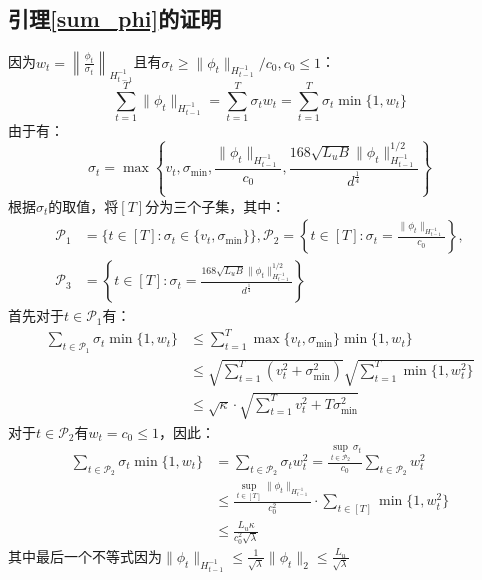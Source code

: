\documentclass[UTF8,a4paper,10.5pt]{ctexart}
\newcommand{\Pcal}{\mathcal P}
\begin{document}
\subsection{引理\ref{sum_phi}的证明}
因为$w_t = \left\|\frac{\phi_t}{\sigma_t}\right\|_{H_{t-1}^{-1}}$且有$\sigma_t\geq \|\phi_t\|_{H_{t-1}^{-1}}/c_0,c_0\leq 1$：
\begin{equation*}
	\sum_{t=1}^{T} \|\phi_t\|_{H_{t-1}^{-1}} = \sum_{t=1}^{T}\sigma_tw_t = \sum_{t=1}^{T}\sigma_t\min\{1,w_t\}
\end{equation*}
由于有：
\begin{equation*}
	\sigma_t= \max\left\{v_t, \sigma_{\min}, \frac{\|\phi_t\|_{H_{t-1}^{-1}}}{c_0}, \frac{168\sqrt{L_uB}\|\phi_t\|^{1/2}_{H_{t-1}^{-1}}}{d^{\frac{1}{4}}}\right\}
\end{equation*}
根据$\sigma_t$的取值，将$[T]$分为三个子集，其中：
\begin{align*}
	\Pcal_1 &= \{t\in [T]: \sigma_t \in \{v_t,\sigma_{\min}\}\}, \Pcal_2 = \left\{t\in [T]:\sigma_t = \frac{\|\phi_t\|_{H_{t-1}^{-1}}}{c_0}\right\}, \\ 
	\Pcal_3 &= \left\{t\in [T]: \sigma_t = \frac{168\sqrt{L_uB}\|\phi_t\|^{1/2}_{H_{t-1}^{-1}}}{d^{\frac{1}{4}}}\right\}
\end{align*}
首先对于$t\in \Pcal_1$有：
\begin{align}
	\sum_{t\in \Pcal_1}\sigma_t\min\{1,w_t\} & \leq \sum_{t=1}^T \max\{v_t, \sigma_{\min}\}\min\{1, w_t\}\nonumber \\
	& \leq \sqrt{\sum_{t=1}^{T}(v_t^2+\sigma_{\min}^2)}\sqrt{\sum_{t=1}^{T}\min\{1,w_t^2\}} \nonumber \\
	& \leq \sqrt{\kappa}\cdot \sqrt{\sum_{t=1}^{T}v_t^2+T\sigma_{\min}^2}
	\label{P1}
\end{align}
对于$t\in \Pcal_2$有$w_t = c_0\leq 1$，因此：
\begin{align}
	\sum_{t\in \Pcal_2}\sigma_t\min\{1,w_t\} & =\sum_{t\in \Pcal_2}\sigma_t w_t^2 = \frac{\sup_{t\in \Pcal_2}\sigma_t}{c_0}\sum_{t\in \Pcal_2}w_t^2 \nonumber \\
	&\leq \frac{\sup_{t\in [T]}\|\phi_t\|_{H_{t-1}^{-1}}}{c_0^2}\cdot \sum_{t\in [T]}\min\{1,w_t^2\} \nonumber \\
	&\leq \frac{L_u\kappa}{c_0^2\sqrt{\lambda}}
	\label{P2}
\end{align}
其中最后一个不等式因为$\|\phi_t\|_{H_{t-1}^{-1}}\leq \frac{1}{\sqrt{\lambda}}\|\phi_t\|_2\leq \frac{L_u}{\sqrt{\lambda}}$
\end{document}

